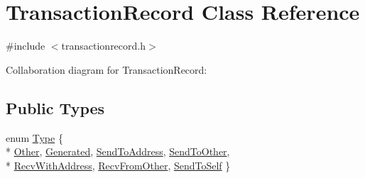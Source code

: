 \hypertarget{class_transaction_record}{}\section{Transaction\+Record Class Reference}
\label{class_transaction_record}


{\ttfamily \#include $<$transactionrecord.\+h$>$}



Collaboration diagram for Transaction\+Record\+:
\subsection*{Public Types}
\begin{DoxyCompactItemize}
\item 
enum \hyperlink{class_transaction_record_afb76f5876fba21c3d2c388b98a35d685}{Type} \{ \\*
\hyperlink{class_transaction_record_afb76f5876fba21c3d2c388b98a35d685aecbcb11ffbb16d3853676e3ce12c12df}{Other}, 
\hyperlink{class_transaction_record_afb76f5876fba21c3d2c388b98a35d685ab15d09d5069ce2dd728812d7ddfbdc7b}{Generated}, 
\hyperlink{class_transaction_record_afb76f5876fba21c3d2c388b98a35d685a92ce91a965ee8cd1c3ca60fe415b0eb0}{Send\+To\+Address}, 
\hyperlink{class_transaction_record_afb76f5876fba21c3d2c388b98a35d685a6bcc2354c3ab1fcaaeb8c1aab51dc889}{Send\+To\+Other}, 
\\*
\hyperlink{class_transaction_record_afb76f5876fba21c3d2c388b98a35d685ab0bb06b109e1fa70877d42a1c22f709f}{Recv\+With\+Address}, 
\hyperlink{class_transaction_record_afb76f5876fba21c3d2c388b98a35d685af952e16195e2dad5c132b3d77856ea05}{Recv\+From\+Other}, 
\hyperlink{class_transaction_record_afb76f5876fba21c3d2c388b98a35d685abbd291cccd8b7d4c1dadfbd69db12c6d}{Send\+To\+Self}
 \}
\end{DoxyCompactItemize}

